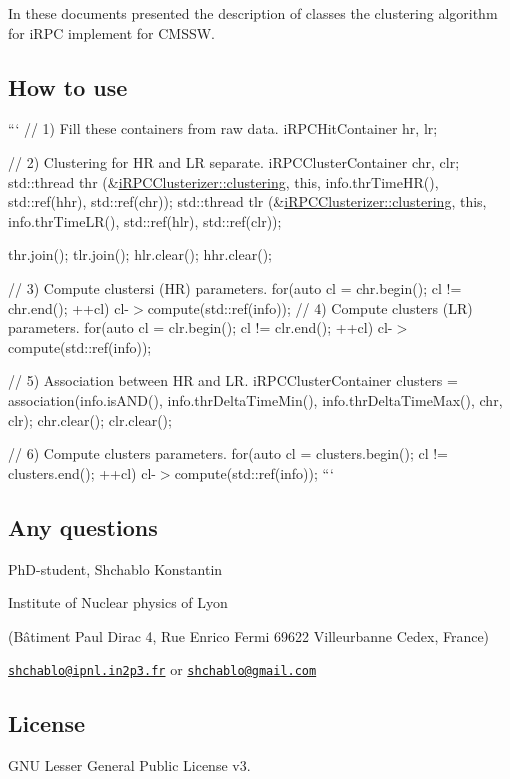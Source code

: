 In these documents presented the description of classes the clustering algorithm for i\-R\-P\-C implement for C\-M\-S\-S\-W.

\subsection*{How to use}

``` // 1) Fill these containers from raw data. i\-R\-P\-C\-Hit\-Container hr, lr;

// 2) Clustering for H\-R and L\-R separate. i\-R\-P\-C\-Cluster\-Container chr, clr; std\-::thread thr (\&\hyperlink{classiRPCClusterizer_a7af579c4a8a834d52aa06c279198d36d}{i\-R\-P\-C\-Clusterizer\-::clustering}, this, info.\-thr\-Time\-H\-R(), std\-::ref(hhr), std\-::ref(chr)); std\-::thread tlr (\&\hyperlink{classiRPCClusterizer_a7af579c4a8a834d52aa06c279198d36d}{i\-R\-P\-C\-Clusterizer\-::clustering}, this, info.\-thr\-Time\-L\-R(), std\-::ref(hlr), std\-::ref(clr));

thr.\-join(); tlr.\-join(); hlr.\-clear(); hhr.\-clear();

// 3) Compute clustersi (H\-R) parameters. for(auto cl = chr.\-begin(); cl != chr.\-end(); ++cl) cl-\/$>$compute(std\-::ref(info)); // 4) Compute clusters (L\-R) parameters. for(auto cl = clr.\-begin(); cl != clr.\-end(); ++cl) cl-\/$>$compute(std\-::ref(info));

// 5) Association between H\-R and L\-R. i\-R\-P\-C\-Cluster\-Container clusters = association(info.\-is\-A\-N\-D(), info.\-thr\-Delta\-Time\-Min(), info.\-thr\-Delta\-Time\-Max(), chr, clr); chr.\-clear(); clr.\-clear();

// 6) Compute clusters parameters. for(auto cl = clusters.\-begin(); cl != clusters.\-end(); ++cl) cl-\/$>$compute(std\-::ref(info)); ``` \subsection*{Any questions}

Ph\-D-\/student, Shchablo Konstantin \par
 Institute of Nuclear physics of Lyon \par
 (Bâtiment Paul Dirac 4, Rue Enrico Fermi 69622 Villeurbanne Cedex, France) \par
 \href{mailto:shchablo@ipnl.in2p3.fr}{\tt shchablo@ipnl.\-in2p3.\-fr} or \href{mailto:shchablo@gmail.com}{\tt shchablo@gmail.\-com}

\subsection*{License}

G\-N\-U Lesser General Public License v3. 